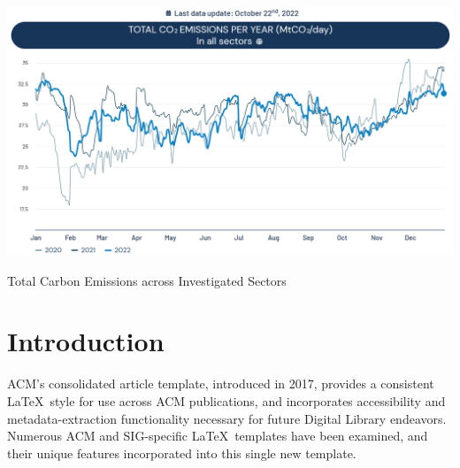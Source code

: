 \documentclass[sigconf, authordraft]{acmart}
\begin{document}
	 
	 


	\begin{teaserfigure}
		\includegraphics[width=\textwidth]{figures/total_carbon_emissions.png}
		\caption{Total Carbon Emissions across Investigated Sectors}
		\Description{}
		\label{fig:teaser}
	\end{teaserfigure}

	  

	\maketitle


	\section{Introduction}
	ACM's consolidated article template, introduced in 2017, provides a consistent
	\LaTeX\ style for use across ACM publications, and incorporates accessibility
	and metadata-extraction functionality necessary for future Digital Library
	endeavors. Numerous ACM and SIG-specific \LaTeX\ templates have been examined,
	and their unique features incorporated into this single new template.
\end{document}
